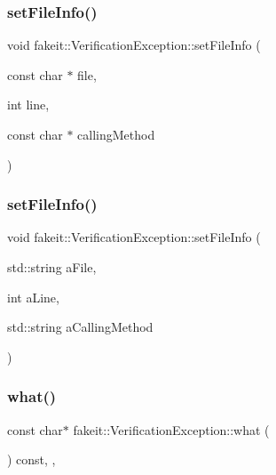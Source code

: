 \subsubsection{\texorpdfstring{setFileInfo()}{setFileInfo()}\hspace{0.1cm}{\footnotesize\ttfamily [3/4]}}
{\footnotesize\ttfamily void fakeit\+::\+Verification\+Exception\+::set\+File\+Info (\begin{DoxyParamCaption}\item[{const char $\ast$}]{file,  }\item[{int}]{line,  }\item[{const char $\ast$}]{calling\+Method }\end{DoxyParamCaption})\hspace{0.3cm}{\ttfamily [inline]}}

\mbox{\label{structfakeit_1_1VerificationException_a4b0bc0c4ef705187fc836a6d0762e19e}} 
\subsubsection{\texorpdfstring{setFileInfo()}{setFileInfo()}\hspace{0.1cm}{\footnotesize\ttfamily [4/4]}}
{\footnotesize\ttfamily void fakeit\+::\+Verification\+Exception\+::set\+File\+Info (\begin{DoxyParamCaption}\item[{std\+::string}]{a\+File,  }\item[{int}]{a\+Line,  }\item[{std\+::string}]{a\+Calling\+Method }\end{DoxyParamCaption})\hspace{0.3cm}{\ttfamily [inline]}}

\mbox{\label{structfakeit_1_1VerificationException_aba8bb8f60a0427c01868a0ab0388fd0b}} 
\subsubsection{\texorpdfstring{what()}{what()}\hspace{0.1cm}{\footnotesize\ttfamily [1/2]}}
{\footnotesize\ttfamily const char$\ast$ fakeit\+::\+Verification\+Exception\+::what (\begin{DoxyParamCaption}{ }\end{DoxyParamCaption}) const\hspace{0.3cm}{\ttfamily [inline]}, {\ttfamily [override]}, {\ttfamily [virtual]}}



